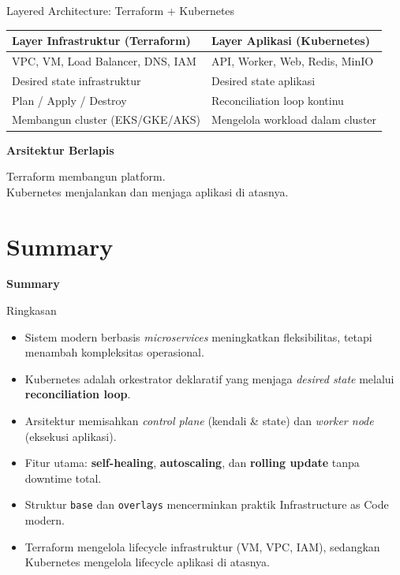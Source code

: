 \documentclass[aspectratio=169, table]{beamer}
\begin{document}
\begin{frame}{Layered Architecture: Terraform + Kubernetes}
\vspace{10pt}
\footnotesize
{}
\begin{tabular}{|p{}|p{}|}
\hline
\textbf{Layer Infrastruktur (Terraform)} &
\textbf{Layer Aplikasi (Kubernetes)} \\
\hline
VPC, VM, Load Balancer, DNS, IAM &
API, Worker, Web, Redis, MinIO \\
\hline
Desired state infrastruktur &
Desired state aplikasi \\
\hline
Plan / Apply / Destroy &
Reconciliation loop kontinu \\
\hline
Membangun cluster (EKS/GKE/AKS) &
Mengelola workload dalam cluster \\
\hline
\end{tabular}

\vspace{8pt}
\textbf{Arsitektur Berlapis}

Terraform membangun platform.\\
Kubernetes menjalankan dan menjaga aplikasi di atasnya.
\end{frame}

\section{Summary}
\begin{frame}{\hfill}
	\centering
	\Huge{\textbf{Summary}}
\end{frame}

\begin{frame}{Ringkasan}
\vspace{10pt}
\begin{itemize}
    \item Sistem modern berbasis \textit{microservices} meningkatkan fleksibilitas, tetapi menambah kompleksitas operasional.
    \item Kubernetes adalah orkestrator deklaratif yang menjaga \textit{desired state} melalui \textbf{reconciliation loop}.
    \item Arsitektur memisahkan \textit{control plane} (kendali \& state) dan \textit{worker node} (eksekusi aplikasi).
    \item Fitur utama: \textbf{self-healing}, \textbf{autoscaling}, dan \textbf{rolling update} tanpa downtime total.
    \item Struktur \texttt{base} dan \texttt{overlays} mencerminkan praktik Infrastructure as Code modern.
    \item Terraform mengelola lifecycle infrastruktur (VM, VPC, IAM), sedangkan Kubernetes mengelola lifecycle aplikasi di atasnya.
\end{itemize}
\end{frame}
\end{document}
